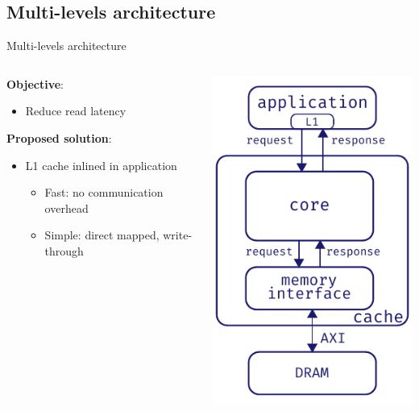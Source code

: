\documentclass[aspectratio=169]{beamer}
\begin{document}
\subsection{Multi-levels architecture}
\begin{frame}{Multi-levels architecture}
	\begin{columns}[c]
		\begin{column}{.55\textwidth}
			\textbf{Objective}:
			\begin{itemize}
				\item Reduce read latency
			\end{itemize}
			
			\bigskip
			\textbf{Proposed solution}:
			\begin{itemize}
				\item L1 cache inlined in application
					\begin{itemize}
						\item Fast: no communication overhead
						\item Simple: direct mapped, write-through
					\end{itemize}
			\end{itemize}
		\end{column}
		\begin{column}{.5\textwidth}
			\begin{center}
			\includegraphics[height=.7\textheight]{l1_arch}
			\end{center}
		\end{column}
	\end{columns}
\end{frame}
\end{document}
